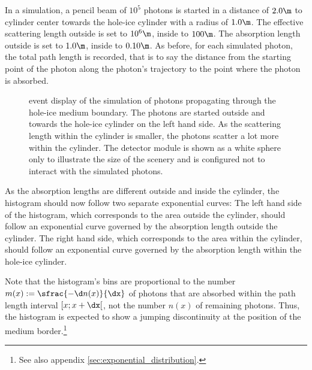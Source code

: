 %

In a simulation, a pencil beam of $10^5$ photons is started in a distance of $2.0\m$ to cylinder center towards the hole-ice cylinder with a radius of $1.0\m$. The effective scattering length outside is set to $10^6\m$, inside to $100\m$. The absorption length outside is set to $1.0\m$, inside to $0.10\m$.
As before, for each simulated photon, the total path length is recorded, that is to say the distance from the starting point of the photon along the photon's trajectory to the point where the photon is absorbed.


\begin{figure}[htb]
  \caption{\steamshovel event display of the simulation of photons propagating through the hole-ice medium boundary. The photons are started outside and towards the hole-ice cylinder on the left hand side. As the scattering length within the cylinder is smaller, the photons scatter a lot more within the cylinder. The detector module is shown as a white sphere only to illustrate the size of the scenery and is configured not to interact with the simulated photons.}
\end{figure}

As the absorption lengths are different outside and inside the cylinder, the histogram should now follow two separate exponential curves: The left hand side of the histogram, which corresponds to the area outside the cylinder, should follow an exponential curve governed by the absorption length outside the cylinder. The right hand side, which corresponds to the area within the cylinder, should follow an exponential curve governed by the absorption length within the hole-ice cylinder.

Note that the histogram's bins are proportional to the number $m(x):=\sfrac{-\d n(x)}{\dx}$ of photons that are absorbed within the path length interval $[x; x+\dx[$, not the number $n(x)$ of remaining photons. Thus, the histogram is expected to show a jumping discontinuity at the position of the medium border.\footnote{See also appendix \ref{sec:exponential_distribution}.}

